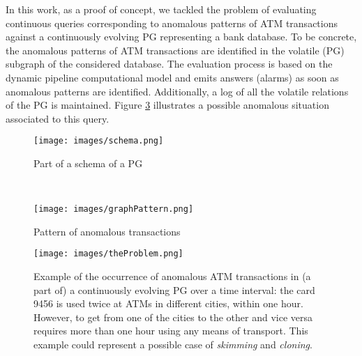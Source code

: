 %
In this work, as a proof of concept,  we tackled the problem of evaluating continuous queries corresponding to anomalous patterns of ATM transactions against a continuously evolving PG representing a bank database. To be concrete, the  anomalous patterns of ATM transactions are identified in the volatile (PG) subgraph of the considered database. The evaluation process is based on the dynamic pipeline computational model and  emits  answers (alarms) as soon as anomalous patterns are identified. Additionally, a log of all the volatile relations of the PG is maintained.  Figure \ref{fig:theProblem} illustrates a possible anomalous situation associated to this query.
%
\begin{figure*}[t!]
    \centering
    \begin{subfigure}[b]{0.6\textwidth}
        \centering
        \texttt{[image: images/schema.png]}
        \caption{Part of a schema of a PG}
         \label{fig:constinuousPGa}
    \end{subfigure}%
     ~ 
    \begin{subfigure}[b]{0.4\textwidth}
        \centering
        \texttt{[image: images/graphPattern.png]}
        \caption{Pattern of anomalous transactions}
        \label{fig:constinuousPGb}
    \end{subfigure}
    \caption{Part of a PG schema specifying volatile (\textsf{interaction} edges) and stable  (\textsf{issued\_by, owned\_by, interbank} edges) relations in an evolving ATM Network and a continuous query pattern.}
    \label{fig:constinuousPG}
\end{figure*}
%
\begin{figure}[h]
         \centering
         \texttt{[image: images/theProblem.png]}
         \caption{Example of the occurrence of anomalous ATM transactions in (a part of) a continuously evolving PG over a time interval: the card \textsf{9456} is used twice at ATMs in different cities, within one hour. However, to get from one of the cities to the other and vice versa requires more than one hour using any means of transport. This example could represent a possible case of \emph{skimming} and \emph{cloning}.}
         \label{fig:theProblem}
\end{figure}
%

